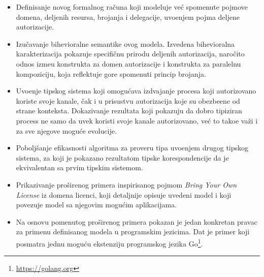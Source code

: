 \begin{itemize}
\item Definisanje novog formalnog ra\v cuna koji modeluje ve\' c spomenute pojmove domena, deljenih resursa, brojanja i delegacije, uvo\dj enjem pojma deljene autorizacije. 
%
\item Izu\v cavanje bihevioralne semantike ovog modela. Izvedena bihevioralna karakterizacija pokazuje specifi\v cnu prirodu deljenih autorizacija, naro\v cito  odnos izme\dj u konstrukta za domen autorizacije i konstrukta za paralelnu kompoziciju, koja reflektuje gore spomenuti princip brojanja. 
%
\item Uvo\dj enje tipskog sistema koji omogu\' cava izdvajanje procesa koji autorizovano koriste svoje kanale, \v cak i u prisustvu autorizacija koje su obezbe\dj ene od strane konteksta. Dokazivanje rezultata koji pokazuju da dobro tipiziran process ne samo da uvek koristi svoje kanale autorizovano, ve\' c to tako\dj e va\v zi i za sve njegove mogu\' ce evolucije. 
%
\item Pobolj\v sanje efikasnosti algoritma za proveru tipa uvo\dj enjem drugog tipskog sistema, za koji je pokazano rezultatom tipske korespondencije da je ekvivalentan sa prvim tipskim sistemom.
%
\item Prikazivanje pro\v sirenog primera inspirisanog pojmom \emph{Bring Your Own License} iz domena licenci, koji detaljnije opisuje uvedeni model i koji povezuje model sa njegovim mogu\' cim aplikacijama.
%
\item Na osnovu pomenutog pro\v sirenog primera pokazan je jedan konkretan pravac za primenu definisanog modela u programskim jezicima. Dat je primer koji posmatra jednu mogu\' cu ekstenziju programskog jezika Go\footnote{\url{https://golang.org}}.
\end{itemize}

